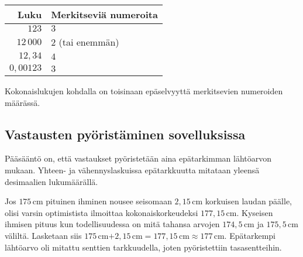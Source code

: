
\begin{center}
\begin{tabular}{r|l}
Luku & Merkitseviä numeroita \\
\hline
$123$ & $3$ \\
$12\,000$ & $2$ (tai enemmän)\\
$12,34$ & $4$ \\
$0,00123$ & $3$
\end{tabular}
\end{center} %


Kokonaislukujen kohdalla on toisinaan epäselvyyttä merkitsevien numeroiden määrässä.

\begin{esimerkki}
\end{esimerkki}

\subsection*{Vastausten pyöristäminen sovelluksissa} %

Pääsääntö on, että vastaukset pyöristetään aina epätarkimman lähtöarvon mukaan. Yhteen- ja vähennyslaskuissa epätarkkuutta mitataan yleensä desimaalien lukumäärällä.

\begin{esimerkki} Jos $175$\,cm pituinen ihminen nousee seisomaan $2,15$\,cm korkuisen laudan päälle, olisi varsin optimistista ilmoittaa kokonaiskorkeudeksi $177,15$\,cm. Kyseisen ihmisen pituus kun todellisuudessa on mitä tahansa arvojen $174,5$\,cm ja $175,5$\,cm väliltä. Lasketaan siis $175$\,cm$+2,15$\,cm$=177,15$\,cm$\approx 177$\,cm. 
Epätarkempi lähtöarvo oli mitattu senttien tarkkuudella, joten pyöristettiin tasasentteihin.
\end{esimerkki}

